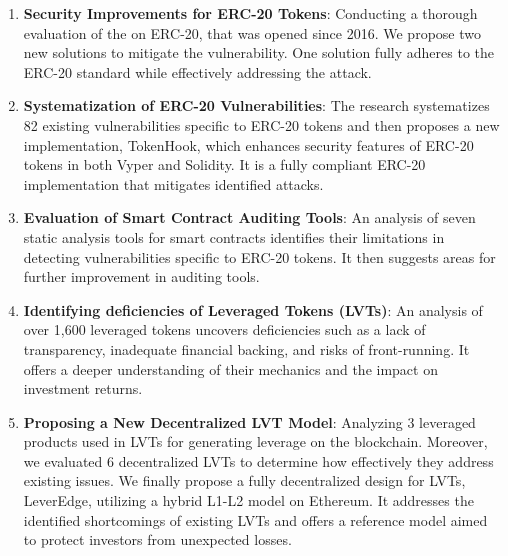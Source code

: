 \begin{enumerate}[label={\ref{sec:summary}.\arabic*},leftmargin=*]
	\item \textbf{Security Improvements for ERC-20 Tokens}: Conducting a thorough evaluation of the \mwa on ERC-20, that was opened since 2016. We propose two new solutions to mitigate the vulnerability. One solution fully adheres to the ERC-20 standard while effectively addressing the attack.

	\item \textbf{Systematization of ERC-20 Vulnerabilities}: The research systematizes 82 existing vulnerabilities specific to ERC-20 tokens and then proposes a new implementation, TokenHook, which enhances security features of ERC-20 tokens in both Vyper and Solidity. It is a fully compliant ERC-20 implementation that mitigates identified attacks.

	\item \textbf{Evaluation of Smart Contract Auditing Tools}: An analysis of seven static analysis tools for smart contracts identifies their limitations in detecting vulnerabilities specific to ERC-20 tokens. It then suggests areas for further improvement in auditing tools.

	\item \textbf{Identifying deficiencies of Leveraged Tokens (LVTs)}: An analysis of over 1,600 leveraged tokens uncovers deficiencies such as a lack of transparency, inadequate financial backing, and risks of front-running. It offers a deeper understanding of their mechanics and the impact on investment returns.

	\item \textbf{Proposing a New Decentralized LVT Model}: Analyzing 3 leveraged products used in LVTs for generating leverage on the blockchain. Moreover, we evaluated 6 decentralized LVTs to determine how effectively they address existing issues. We finally propose a fully decentralized design for LVTs, LeverEdge, utilizing a hybrid L1-L2 model on Ethereum. It addresses the identified shortcomings of existing LVTs and offers a reference model aimed to protect investors from unexpected losses.
\end{enumerate}